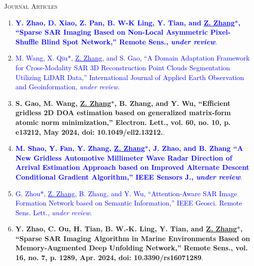 \documentclass[paper=a4,fontsize=11pt]{scrartcl}
\begin{document}
%
%

\textsc{Journal Articles}

\begin{enumerate}
	
\item \textcolor{blue}{\textbf{Y. Zhao, D. Xiao, Z. Pan, B. W-K Ling, Y. Tian, and \underline{Z. Zhang$\ast$}, ``Sparse SAR Imaging Based on Non-Local Asymmetric Pixel-Shuffle Blind Spot Network,'' Remote Sens., \emph{under review}}}.

\item \textcolor{blue}{M. Wang, X. Qiu$\ast$, \underline{Z. Zhang}, and S. Gao, ``A Domain Adaptation Framework for Cross-Modality SAR 3D Reconstruction Point Clouds Segmentation Utilizing LiDAR Data,'' International Journal of Applied Earth Observation and Geoinformation, \emph{under review}.}

\item \textbf{S. Gao, M. Wang, \underline{Z. Zhang$\ast$}, B. Zhang, and Y. Wu, 	``Efficient gridless 2D DOA estimation based on generalized matrix‐form atomic norm minimization,'' Electron. Lett., vol. 60, no. 10, p. e13212, May 2024, doi: 10.1049/ell2.13212.}.

\item \textcolor{blue}{\textbf{M. Shao, Y. Fan, Y. Zhang, \underline{Z. Zhang$\ast$}, J. Zhao, and B. Zhang ``A New Gridless Automotive Millimeter Wave Radar Direction of Arrival Estimation Approach based on Improved  Alternate Descent Conditional Gradient Algorithm,'' IEEE Sensors J., \emph{under review}}}.

\item \textcolor{blue}{G. Zhou$\ast$, \underline{Z. Zhang}, B. Zhang, and Y. Wu, ``Attention-Aware SAR Image Formation Network based on Semantic Information,'' IEEE Geosci. Remote Sens. Lett., \emph{under review}}.

\item \textbf{Y. Zhao, C. Ou, H. Tian, B. W.-K. Ling, Y. Tian, and \underline{Z. Zhang$\ast$}, ``Sparse SAR Imaging Algorithm in Marine Environments Based on Memory-Augmented Deep Unfolding Network,'' Remote Sens., vol. 16, no. 7, p. 1289, Apr. 2024, doi: 10.3390/rs16071289}.


\end{enumerate}
\end{document}
